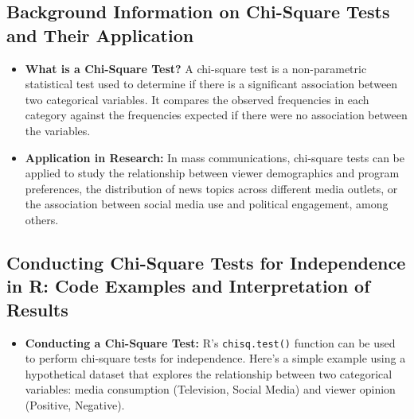 \documentclass[
]{book}
\providecommand{\tightlist}{%
  \setlength{\itemsep}{0pt}\setlength{\parskip}{0pt}}
\begin{document}
\hypertarget{background-information-on-chi-square-tests-and-their-application}{%
\subsection{Background Information on Chi-Square Tests and Their Application}\label{background-information-on-chi-square-tests-and-their-application}}

\begin{itemize}
\item
  \textbf{What is a Chi-Square Test?} A chi-square test is a non-parametric statistical test used to determine if there is a significant association between two categorical variables. It compares the observed frequencies in each category against the frequencies expected if there were no association between the variables.
\item
  \textbf{Application in Research:} In mass communications, chi-square tests can be applied to study the relationship between viewer demographics and program preferences, the distribution of news topics across different media outlets, or the association between social media use and political engagement, among others.
\end{itemize}

\hypertarget{conducting-chi-square-tests-for-independence-in-r-code-examples-and-interpretation-of-results}{%
\subsection*{Conducting Chi-Square Tests for Independence in R: Code Examples and Interpretation of Results}\label{conducting-chi-square-tests-for-independence-in-r-code-examples-and-interpretation-of-results}}

\begin{itemize}
\tightlist
\item
  \textbf{Conducting a Chi-Square Test:} R's \texttt{chisq.test()} function can be used to perform chi-square tests for independence. Here's a simple example using a hypothetical dataset that explores the relationship between two categorical variables: media consumption (Television, Social Media) and viewer opinion (Positive, Negative).
\end{itemize}
\end{document}
